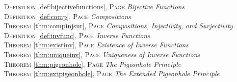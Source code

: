 \begin{multicols}{2}
{         \textsc{Definition} \ref{def:bijectivefunctions}, \textsc{Page} \pageref{def:bijectivefunctions} \textit{Bijective Functions} \\
         \textsc{Definition} \ref{def:comp}, \textsc{Page} \pageref{def:comp} \textit{Compositions} \\
         \textsc{Theorem} \ref{thm:compinjsur}, \textsc{Page} \pageref{thm:compinjsur} \textit{Compositions, Injectivity, and Surjectivity} \\
         \textsc{Definition} \ref{def:invfunc}, \textsc{Page} \pageref{def:invfunc} \textit{Inverse Functions} \\
         \textsc{Theorem} \ref{thm:existinv}, \textsc{Page} \pageref{thm:existinv} \textit{Existence of Inverse Functions} \\
         \textsc{Theorem} \ref{thm:uniqueinv}, \textsc{Page} \pageref{thm:uniqueinv} \textit{Uniqueness of Inverse Functions} \\
         \textsc{Theorem} \ref{thm:pigeonhole}, \textsc{Page} \pageref{thm:pigeonhole} \textit{The Pigeonhole Principle} \\
         \textsc{Theorem} \ref{thm:extpigeonhole}, \textsc{Page} \pageref{thm:extpigeonhole} \textit{The Extended Pigeonhole Principle} \\         
      }
\end{multicols}
